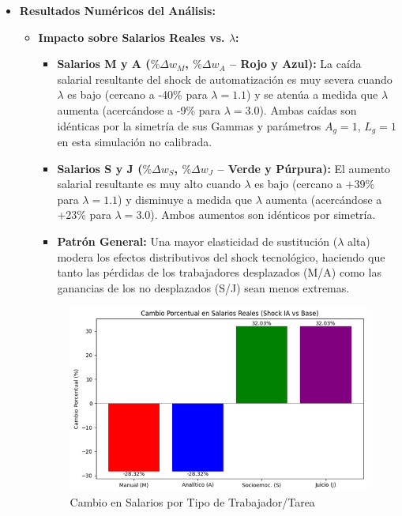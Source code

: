 \documentclass{article}
\theoremstyle{remark}
\theoremstyle{definition}
\begin{document}
\begin{enumerate}
\begin{tcolorbox}[title= Soluci\'on 5]
\begin{itemize}
             \item \textbf{Resultados Numéricos del Análisis:}
                \begin{itemize}
                    \item \textbf{Impacto sobre Salarios Reales vs. \(\lambda\):}                    
                    \begin{itemize}
                        \item \textbf{Salarios M y A ($\%\Delta w_M$, $\%\Delta w_A$ – Rojo y Azul):} La caída salarial resultante del shock de automatizaci\'on es muy severa cuando $\lambda$ es bajo (cercano a -40\% para \(\lambda=1.1\)) y se atenúa a medida que \(\lambda\) aumenta (acercándose a -9\% para \(\lambda=3.0\)). Ambas caídas son idénticas por la simetría de sus Gammas y parámetros \(A_g=1\), \(L_g=1\) en esta simulación no calibrada.
                        \item \textbf{Salarios S y J (\(\%\Delta w_S\), \(\%\Delta w_J\) – Verde y Púrpura):} El aumento salarial resultante es muy alto cuando \(\lambda\) es bajo (cercano a +39\% para \(\lambda=1.1\)) y disminuye a medida que \(\lambda\) aumenta (acercándose a +23\% para \(\lambda=3.0\)). Ambos aumentos son idénticos por simetría.
                        \item \textbf{Patrón General:} Una mayor elasticidad de sustitución (\(\lambda\) alta) modera los efectos distributivos del shock tecnológico, haciendo que tanto las pérdidas de los trabajadores desplazados (M/A) como las ganancias de los no desplazados (S/J) sean menos extremas.
                    \end{itemize}
                    \begin{figure}[H] 
                        \centering
                        \includegraphics[width=0.7\linewidth]{views/entrega2/41.png}
                        \caption{Cambio en Salarios por Tipo de Trabajador/Tarea}
                        \label{fig:grafsal}
                    \end{figure}


\end{itemize}
\end{itemize}
\end{tcolorbox}
\end{enumerate}
\end{document}
